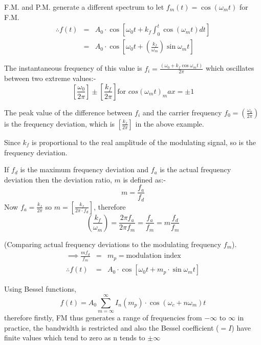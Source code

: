 \documentclass[11pt]{article} %
\begin{document}
		F.M. and P.M. generate a different spectrum to let $f_m(t) = \cos{\left(\omega_mt\right)}$ for F.M.
		\begin{eqnarray}
			\therefore f(t) &=& A_0 \cdot \cos{\left[\omega_0t + k_f\int^t_0\cos{\left(\omega_mt\right)}dt\right]} \nonumber \\
			&=& A_0\cdot\cos{\left[\omega_0t+\left( \frac{k_f}{\omega_m}\right)\sin{\omega_mt }\right]}
		\end{eqnarray}

		The instantaneous frequency of this value is $f_i = \frac{(\omega_0 +k_f\cos{\omega_mt})}{2\pi}$ which oscillates between two extreme values:-
		\begin{equation}
			\left[ \frac{\omega_0}{2\pi} \right] \pm \left[ \frac{k_f}{2\pi} \right] \mbox{for } cos(\omega_mt)_max=\pm 1
		\end{equation}

		The peak value of the difference between $f_i$ and the carrier frequency $f_0 = \left( \frac{\omega_0}{2\pi}\right)$ is the frequency deviation, which is $\left[ \frac{k_f}{2\pi}\right]$ in the above example.

		Since $k_f$ is proportional to the real amplitude of the modulating signal, so is the frequency deviation.

		If $f_d$ is the maximum frequency deviation and $f_a$ is the actual frequency deviation then the deviation ratio, $m$ is defined as:-
		\begin{equation}
			m=\frac{f_a}{f_d}
		\end{equation}
		Now $f_a = \frac{k_f}{2\pi}$ so $m=\left[\frac{k_f}{2\pi\cdot f_d}\right]$, therefore		
		\begin{equation}
			\left(\frac{k_f}{\omega_m}\right) = \frac{2\pi f_a}{2\pi f_m} = \frac{f_a}{f_m} = m\frac{f_d}{f_m}
		\end{equation}

		(Comparing actual frequency deviations to the modulating frequency $f_m$).
		\begin{eqnarray}
			\implies \frac{mf_d}{f_m} &=& m_p = \mbox{modulation index} \nonumber \\
			\therefore f(t) &=& A_0 \cdot\cos{\left[\omega_0t+m_p\cdot\sin{\omega_mt}\right]}
		\end{eqnarray}

		Using Bessel functions, 
		\begin{equation}
			f(t) = A_0 \sum_{m=\infty}^{\infty}{I_n(m_p)\cdot \cos{(\omega_c + n\omega_m)}t}
		\end{equation}
		therefore firstly, FM thus generates a range of frequencies from $-\infty$ to $\infty$ in practice, the bandwidth is restricted and also the Bessel coefficient ($=I$) have finite values which tend to zero as n tends to $\pm \infty$
\end{document}

